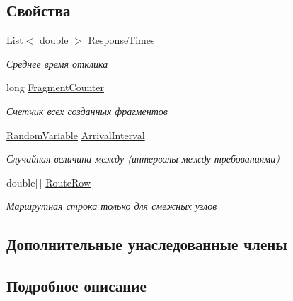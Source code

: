 \subsection*{Свойства}
\begin{DoxyCompactItemize}
\item 
List$<$ double $>$ \hyperlink{class_network_simulator_1_1_source_node_ad631f434c90a58a65f71945f5cecd82d}{Response\+Times}
\begin{DoxyCompactList}\small\item\em Среднее время отклика \end{DoxyCompactList}\item 
long \hyperlink{class_network_simulator_1_1_source_node_afaf73f99d665080e19cc98941c24af31}{Fragment\+Counter}
\begin{DoxyCompactList}\small\item\em Счетчик всех созданных фрагментов \end{DoxyCompactList}\item 
\hyperlink{class_random_variables_1_1_random_variable}{Random\+Variable} \hyperlink{class_network_simulator_1_1_source_node_a9da60399e7ba58e5eea72a57acf69b8e}{Arrival\+Interval}
\begin{DoxyCompactList}\small\item\em Случайная величина между (интервалы между требованиями) \end{DoxyCompactList}\item 
double\mbox{[}$\,$\mbox{]} \hyperlink{class_network_simulator_1_1_source_node_aa06f15bdfd1627ca01d35acb9bae863b}{Route\+Row}
\begin{DoxyCompactList}\small\item\em Маршрутная строка только для смежных узлов \end{DoxyCompactList}\end{DoxyCompactItemize}
\subsection*{Дополнительные унаследованные члены}


\subsection{Подробное описание}


